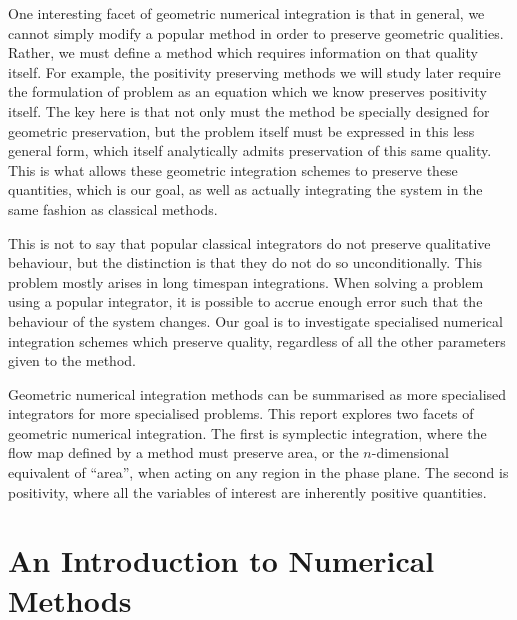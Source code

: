 One interesting facet of geometric numerical integration is that in general, we cannot simply modify a popular method in order to preserve geometric qualities.
Rather, we must define a method which requires information on that quality itself.
For example, the positivity preserving methods we will study later require the formulation of problem as an equation which we know preserves positivity itself.
The key here is that not only must the method be specially designed for geometric preservation,
but the problem itself must be expressed in this less general form, which itself analytically admits preservation of this same quality.
This is what allows these geometric integration schemes to preserve these quantities, which is our goal, as well as actually integrating the system in the same fashion as classical methods.

This is not to say that popular classical integrators do not preserve qualitative behaviour, but the distinction is that they do not do so unconditionally.
This problem mostly arises in long timespan integrations.
When solving a problem using a popular integrator, it is possible to accrue enough error such that the behaviour of the system changes.
Our goal is to investigate specialised numerical integration schemes which preserve quality, regardless of all the other parameters given to the method.

Geometric numerical integration methods can be summarised as more specialised integrators for more specialised problems.
This report explores two facets of geometric numerical integration.
The first is symplectic integration, where the flow map defined by a method must preserve area, or the $n$-dimensional equivalent of ``area'',
when acting on any region in the phase plane.
The second is positivity, where all the variables of interest are inherently positive quantities.

\section{An Introduction to Numerical Methods}

